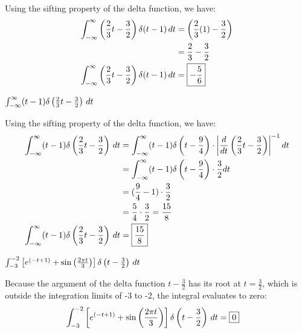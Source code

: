 \documentclass[a4paper, 10pt]{article}
\begin{document}
\begin{tosubmit}
\par\noindent\submitsolution
Using the sifting property of the delta function, we have:
\begin{align*}
    \int_{-\infty}^{\infty} \left(\frac{2}{3}t-\frac{3}{2}\right) \delta(t-1) \,dt &= \left(\frac{2}{3}(1)-\frac{3}{2}\right) \\
    &= \frac{2}{3} - \frac{3}{2} \\
    \int_{-\infty}^{\infty} \left(\frac{2}{3}t-\frac{3}{2}\right) \delta(t-1) \,dt &= \boxed{-\frac{5}{6}}
\end{align*}
\end{tosubmit}


\begin{subproblems}[start=2]
    \item \( \int_{-\infty}^{\infty} (t-1) \delta \left(\frac{2}{3}t- \frac{3}{2} \right) \,dt \)
\end{subproblems}

\begin{solution}
Using the sifting property of the delta function, we have:
\begin{align*}
    \int_{-\infty}^{\infty} (t-1) \delta \left(\frac{2}{3}t- \frac{3}{2} \right) \,dt &= \int_{-\infty}^{\infty} (t-1) \delta \left(t - \frac{9}{4}\right) \cdot \left| \frac{d}{dt} \left( \frac{2}{3}t - \frac{3}{2} \right) \right|^{-1} dt \\
    &= \int_{-\infty}^{\infty} (t-1) \delta \left(t - \frac{9}{4}\right) \cdot \frac{3}{2} dt \\
    &= ( \frac{9}{4} - 1 ) \cdot \frac{3}{2} \\
    &= \frac{5}{4} \cdot \frac{3}{2} = \frac{15}{8} \\
    \int_{-\infty}^{\infty} (t-1) \delta \left(\frac{2}{3}t- \frac{3}{2} \right) \,dt &= \boxed{\frac{15}{8}}
\end{align*}
\end{solution}


\begin{subproblems}[start=3]
    \item \( \int_{-3}^{-2} \left[ e^{(-t+1)} + \sin \left( \frac{2\pi t}{3} \right) \right] \delta \left(t- \frac{3}{2} \right) \,dt \)
\end{subproblems}

\begin{tosubmit}
\par\noindent\submitsolution
Because the argument of the delta function \( t - \frac{3}{2} \) has its root at \( t = \frac{3}{2} \), which is outside the integration limits of -3 to -2, the integral evaluates to zero:
\begin{align*}
    \int_{-3}^{-2} \left[ e^{(-t+1)} + \sin \left( \frac{2\pi t}{3} \right) \right] \delta \left(t- \frac{3}{2} \right) \,dt &= \boxed{0}
\end{align*}
\end{tosubmit}
\end{document}
